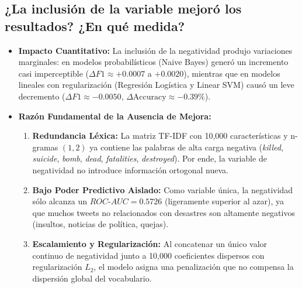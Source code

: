 \documentclass[11pt,a4paper]{article}
\begin{document}
\subsection{¿La inclusión de la variable mejoró los resultados? ¿En qué medida?}
\begin{itemize}
    \item \textbf{Impacto Cuantitativo:} La inclusión de la negatividad produjo variaciones marginales: en modelos probabilísticos (Naive Bayes) generó un incremento casi imperceptible ($\Delta F1 \approx +0.0007$ a $+0.0020$), mientras que en modelos lineales con regularización (Regresión Logística y Linear SVM) causó un leve decremento ($\Delta F1 \approx -0.0050$, $\Delta \text{Accuracy} \approx -0.39\%$).
    \item \textbf{Razón Fundamental de la Ausencia de Mejora:}
    \begin{enumerate}
        \item \textbf{Redundancia Léxica:} La matriz TF-IDF con 10,000 características y n-gramas $(1,2)$ ya contiene las palabras de alta carga negativa (\textit{killed}, \textit{suicide}, \textit{bomb}, \textit{dead}, \textit{fatalities}, \textit{destroyed}). Por ende, la variable de negatividad no introduce información ortogonal nueva.
        \item \textbf{Bajo Poder Predictivo Aislado:} Como variable única, la negatividad sólo alcanza un $ROC\text{-}AUC = 0.5726$ (ligeramente superior al azar), ya que muchos tweets no relacionados con desastres son altamente negativos (insultos, noticias de política, quejas).
        \item \textbf{Escalamiento y Regularización:} Al concatenar un único valor continuo de negatividad junto a 10,000 coeficientes dispersos con regularización $L_2$, el modelo asigna una penalización que no compensa la dispersión global del vocabulario.
    \end{enumerate}
\end{itemize}
\end{document}
